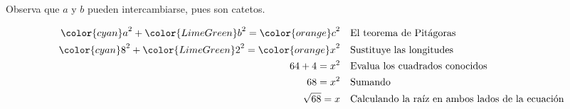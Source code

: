\begin{minipage}[t][][t]{0.65\textwidth}
\begin{solutionbox}{9.5cm}
\begin{minipage}{0.65\textwidth}
            Observa que $a$ y $b$ pueden intercambiarse, pues son catetos.
        \end{minipage}
        \begin{align*}
            {\color{cyan}a}^2+{\color{LimeGreen}b}^2  ={\color{orange}c}^2 & \text{\quad El teorema de Pitágoras}                          \\
            {\color{cyan}8}^2+{\color{LimeGreen}2}^2  ={\color{orange}x}^2 & \text{\quad Sustituye las longitudes}                         \\
            64+4   =x^2                                                    & \text{\quad Evalua los cuadrados conocidos}                   \\
            68=x^2                                                         & \text{\quad Sumando }                                         \\
            \sqrt{68}=x                                                    & \text{\quad Calculando la raíz en ambos lados de la ecuación} \\
        \end{align*}
    \end{solutionbox}
\end{minipage}
